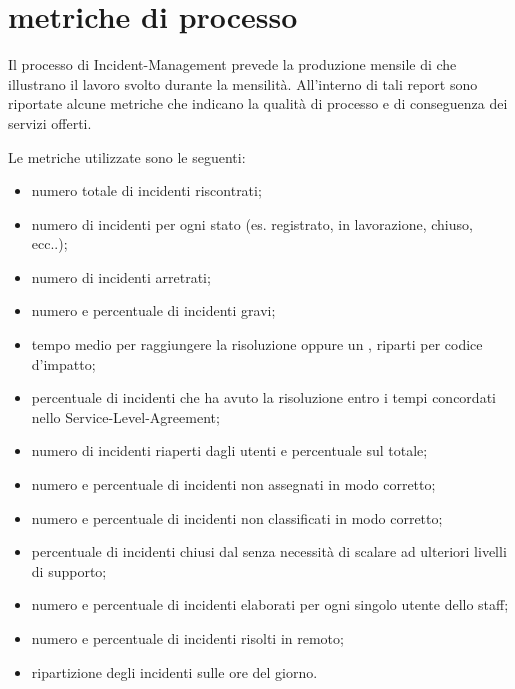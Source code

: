 %
%
\section[Metriche di processo]{metriche di processo}
\label{im-metrics}
Il processo di \ac{Incident-Management} prevede la produzione mensile di  che illustrano il lavoro svolto durante la mensilità. All'interno di tali report sono riportate alcune metriche che indicano la qualità di processo e di conseguenza dei servizi offerti.

Le metriche utilizzate sono le seguenti:

\begin{itemize}
\item{numero totale di incidenti riscontrati;}
\item{numero di incidenti per ogni stato (es. registrato, in lavorazione, chiuso, ecc..);}
\item{numero di incidenti arretrati;}
\item{numero e percentuale di incidenti gravi;}
\item{tempo medio per raggiungere la risoluzione oppure un , riparti per codice d'impatto;}
\item{percentuale di incidenti che ha avuto la risoluzione entro i tempi concordati nello \ac{Service-Level-Agreement};}
\item{numero di incidenti riaperti dagli utenti e percentuale sul totale;}
\item{numero e percentuale di incidenti non assegnati in modo corretto;}
\item{numero e percentuale di incidenti non classificati in modo corretto;}
\item{percentuale di incidenti chiusi dal  senza necessità di scalare ad ulteriori livelli di supporto;}
\item{numero e percentuale di incidenti elaborati per ogni singolo utente dello staff;}
\item{numero e percentuale di incidenti risolti in remoto;}
\item{ripartizione degli incidenti sulle ore del giorno.}
\end{itemize}